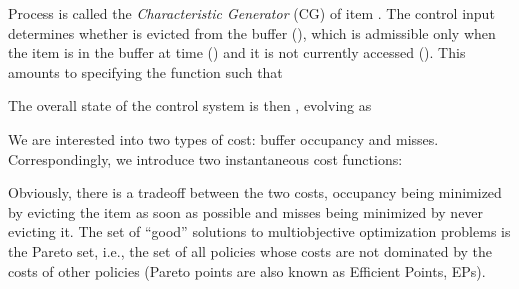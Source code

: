 \documentclass[11pt,a4paper]{article}
\theoremstyle{definition}
\theoremstyle{remark}
\begin{document}
Process  is called the \emph{Characteristic Generator}
(CG) of item .  The control input 
determines whether  is evicted from the buffer (),
which is admissible only when the item is in the buffer at time 
() and it is not currently accessed
(). This amounts to specifying the function
 such that

The overall state of the control system is then , evolving as

We are interested into two types of cost: buffer occupancy and misses.
Correspondingly, we introduce two instantaneous cost functions:

Obviously, there is a tradeoff between the two costs, occupancy being
minimized by evicting the item as soon as possible and misses being minimized by
never evicting it. The set of ``good'' solutions to multiobjective optimization
problems is the Pareto set, i.e., the set of all policies whose costs are not
dominated by the costs of other policies (Pareto points are also known as
Efficient Points, EPs).
\end{document}
